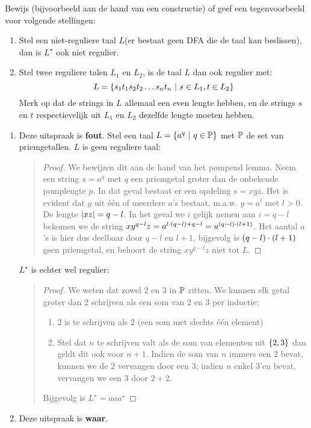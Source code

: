 \documentclass{article}
\begin{document}
\begin{question}
Bewijs (bijvoorbeeld aan de hand van een constructie) of geef een tegenvoorbeeld voor volgende stellingen:
\begin{enumerate}
 \item Stel een niet-reguliere taal $L$(er bestaat geen DFA die de taal kan beslissen), dan is $L^{\star}$ ook niet regulier.
 \item Stel twee reguliere talen $L_1$ en $L_2$, is de taal $L$ dan ook regulier met:
 \begin{equation}
  L=\left\{ s_1t_1s_2t_2\ldots s_nt_n\ |\ s\in L_1,t\in L_2 \right\}
 \end{equation}
 Merk op dat de strings in $L$ allemaal een even lengte hebben, en de strings $s$ en $t$ respectievelijk uit $L_1$ en $L_2$ dezelfde lengte moeten hebben.
\end{enumerate}
\begin{answer}
\begin{enumerate}
 \item Deze uitspraak is \textbf{fout}. Stel een taal $L=\left\{ a^q\ |\ q\in\mathbb{P} \right\}$ met $\mathbb{P}$ de set van priemgetallen. $L$ is geen reguliere taal:
 \begin{quote}
 \begin{proof}
 We bewijzen dit aan de hand van het pompend lemma. Neem een string $s=a^q$ met $q$ een priemgetal groter dan de onbekende pomplengte $p$. In dat geval bestaat er een opdeling $s=xyz$. Het is evident dat $y$ uit \'e\'en of meerdere $a$'s bestaat, m.a.w. $y=a^l$ met $l>0$. De lengte $\left|xz\right|=q-l$. In het geval we $i$ gelijk nemen aan $i=q-l$ bekomen we de string $xy^{q-l}z=a^{l\cdot\left( q-l \right)+q-l}=a^{\left( q-l \right)\cdot\left( l+1 \right)}$. Het aantal $a$'s is hier dus deelbaar door $q-l$ en $l+1$, bijgevolg is $\left( q-l \right)\cdot\left( l+1 \right)$ geen priemgetal, en behoort de string $xy^{q-l}z$ niet tot $L$.
 \end{proof}
 \end{quote}
 $L^{\star}$ is echter wel regulier:
 \begin{quote}
 \begin{proof}
 We weten dat zowel $2$ en $3$ in $\mathbb{P}$ zitten. We kunnen elk getal groter dan $2$ schrijven als een som van $2$ en $3$ per inductie:
 \begin{enumerate}
  \item $2$ is te schrijven als $2$ (een som met slechts \'e\'en element)
  \item Stel dat $n$ te schrijven valt als de som van elementen uit $\left\{ 2,3 \right\}$ dan geldt dit ook voor $n+1$. Indien de som van $n$ immers een $2$ bevat, kunnen we de $2$ vervangen door een $3$; indien $n$ enkel $3$'en bevat, vervangen we een $3$ door $2+2$.
 \end{enumerate}
 Bijgevolg is $L^{\star}=aaa^{\star}$
 \end{proof}
 \end{quote}
 \item Deze uitspraak is \textbf{waar}.
\end{enumerate}
\end{answer}
\end{question}
\end{document}
